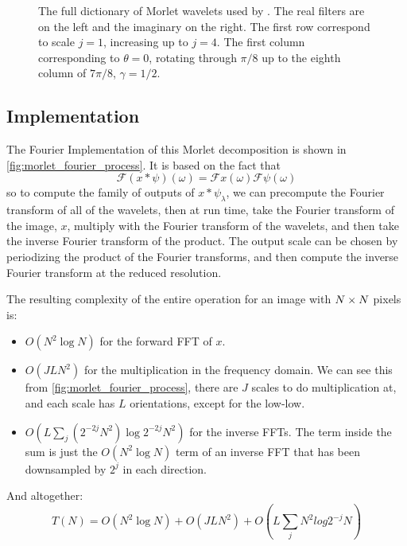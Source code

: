   \begin{figure}
    \begin{center}
      \makebox[\textwidth][c]{%
      }
      \caption[The full dictionary of Morlet wavelets used by Mallat]
              {The full dictionary of Morlet wavelets used by \Mallat. The real
               filters are on the left and the imaginary on the right. The first
               row correspond to scale $j=1$, increasing up to $j=4$. The first column
               corresponding to $\theta = 0$, rotating through $\pi/8$ up to the eighth 
               column of $7\pi/8$, $\gamma=1/2$.} 
      \label{fig:morlet_wavelets_full}
    \end{center}
  \end{figure}

\subsection{Implementation}\label{sec:morlet_implementation}
  The Fourier Implementation of this Morlet decomposition is shown in
  \autoref{fig:morlet_fourier_process}. It is based on the fact that 
  \begin{equation}
    \mathcal{F}(x \ast \psi)(\omega)
    = \mathcal{F}x(\omega)\mathcal{F}\psi(\omega)
  \end{equation}
  so to compute the family of outputs of $x\ast \psi_{\lambda}$, we can
  precompute the Fourier transform of all of the wavelets, then at run time,
  take the Fourier transform of the image, $x$, multiply with the Fourier
  transform of the wavelets, and then take the inverse Fourier transform of the
  product. The output scale can be chosen by periodizing the product of the
  Fourier transforms, and then compute the inverse Fourier transform at the
  reduced resolution.

  The resulting complexity of the entire operation for an image 
  with $N\times N$ pixels is:
  \begin{itemize}
    \item $O(N^{2} \log N)$ for the forward FFT of $x$.
    \item $O(JLN^{2})$ for the multiplication in the frequency domain. We can see
      this from \autoref{fig:morlet_fourier_process}, there are $J$ scales to
      do multiplication at, and each scale has $L$ orientations, except for the
      low-low.
    \item $O(L \sum_j (2^{-2j}N^{2}) \log {2^{-2j}N^{2}})$ for the inverse FFTs. The
      term inside the sum is just the $O(N^2\log N)$ term of an inverse FFT that
      has been downsampled by $2^j$ in each direction.
  \end{itemize}
  And altogether:
  \begin{equation}
    T(N) = O(N^2 \log N) + O (JLN^{2}) + O(L \sum_{j} N^{2} log 2^{-j} N)
    \label{eq:morlet_efficiency}
  \end{equation}

